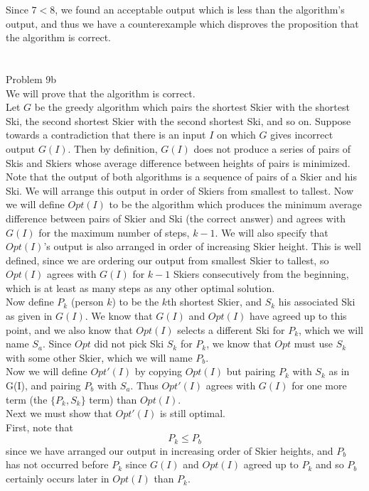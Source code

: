 \documentclass[11pt]{article}
\begin{document}
Since $7 < 8$, we found an acceptable output which is less than the algorithm's output, and thus we have a counterexample which disproves the proposition that the algorithm is correct.\\
\\
\\
\noindent \huge 
Problem 9b\\
\normalsize
\noindent 
We will prove that the algorithm is correct.\\
Let $G$ be the greedy algorithm which pairs the shortest Skier with the shortest Ski, the second shortest Skier with the second shortest Ski, and so on. Suppose towards a contradiction that there is an input $I$ on which $G$ gives incorrect output $G(I)$. Then by definition, $G(I)$ does not produce a series of pairs of Skis and Skiers whose average difference between heights of pairs is minimized.\\
Note that the output of both algorithms is a sequence of pairs of a Skier and his Ski. We will arrange this output in order of Skiers from smallest to tallest. Now we will define $Opt(I)$ to be the algorithm which produces the minimum average difference between pairs of Skier and Ski (the correct answer) and agrees with $G(I)$ for the maximum number of steps, $k-1$. We will also specify that $Opt(I)$'s output is also arranged in order of increasing Skier height. This is well defined, since we are ordering our output from smallest Skier to tallest, so $Opt(I)$ agrees with $G(I)$ for $k-1$ Skiers consecutively from the beginning, which is at least as many steps as any other optimal solution.\\
Now define $P_k$ (person $k$) to be the $k$th shortest Skier, and $S_k$ his associated Ski as given in $G(I)$. We know that $G(I)$ and $Opt(I)$ have agreed up to this point, and we also know that $Opt(I)$ selects a different Ski for $P_k$, which we will name $S_a$. Since $Opt$ did not pick Ski $S_k$ for $P_k$, we know that $Opt$ must use $S_k$ with some other Skier, which we will name $P_b$.\\
Now we will define $Opt'(I)$ by copying $Opt(I)$ but pairing $P_k$ with $S_k$ as in G(I), and pairing $P_b$ with $S_a$. Thus $Opt'(I)$ agrees with $G(I)$ for one more term (the $\{P_k, S_k\}$ term) than $Opt(I)$.\\
Next we must show that $Opt'(I)$ is still optimal.\\
First, note that 
\[
P_k \le P_b
\]
since we have arranged our output in increasing order of Skier heights, and $P_b$ has not occurred before $P_k$ since $G(I)$ and $Opt(I)$ agreed up to $P_k$ and so $P_b$ certainly occurs later in $Opt(I)$ than $P_k$.\\
\end{document}
